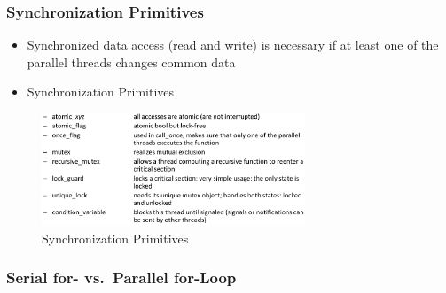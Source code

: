 \hypertarget{synchronization-primitives}{%
\subsubsection{Synchronization
Primitives}\label{synchronization-primitives}}

\begin{itemize}
\tightlist
\item
  Synchronized data access (read and write) is necessary if at least one
  of the parallel threads changes common data
\item
  Synchronization Primitives
\end{itemize}

\begin{figure}[H]
\centering
\includegraphics[width=0.7\textwidth]{figures/sync-primitives.png}
\caption{Synchronization Primitives}
\end{figure}

\hypertarget{serial-for--vs.parallel-for-loop}{%
\subsubsection{Serial for- vs.~Parallel
for-Loop}\label{serial-for--vs.parallel-for-loop}}

